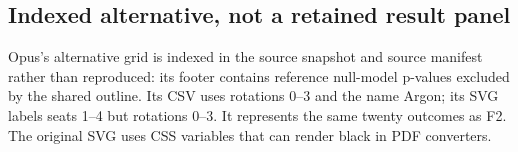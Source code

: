 \subsection*{Indexed alternative, not a retained result panel}
Opus's alternative grid is indexed in the source snapshot and source manifest rather than reproduced: its footer contains reference null-model p-values excluded by the shared outline. Its CSV uses rotations 0--3 and the name Argon; its SVG labels seats 1--4 but rotations 0--3. It represents the same twenty outcomes as F2. The original SVG uses CSS variables that can render black in PDF converters.
\clearpage
\begin{landscape}

\clearpage
\end{landscape}
\clearpage
\begin{landscape}

\clearpage
\end{landscape}
\clearpage
\begin{landscape}

\clearpage
\end{landscape}
\clearpage
\begin{landscape}

\clearpage
\end{landscape}
\clearpage

